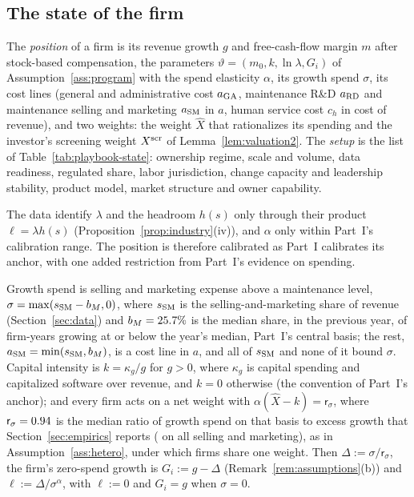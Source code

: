 \subsection{The state of the firm}\label{sec:playbook-state}

\begin{definition}[State]\label{def:playbook-state}
The \emph{position} of a firm is its revenue growth $g$ and free-cash-flow margin $m$ after stock-based compensation, the parameters $\vartheta=(m_0,k,\ln\lambda,G_i)$ of Assumption~\ref{ass:program} with the spend elasticity $\alpha$, its growth spend $\sigma$, its cost lines (general and administrative cost $a_{\rm GA}$, maintenance R\&D $a_{\rm RD}$ and maintenance selling and marketing $a_{\rm SM}$ in $a$, human service cost $c_h$ in cost of revenue), and two weights: the weight $\hat X$ that rationalizes its spending and the investor's screening weight $X^{\rm scr}$ of Lemma~\ref{lem:valuation2}. The \emph{setup} is the list of Table~\ref{tab:playbook-state}: ownership regime, scale and volume, data readiness, regulated share, labor jurisdiction, change capacity and leadership stability, product model, market structure and owner capability.
\end{definition}

The data identify $\lambda$ and the headroom $h(s)$ only through their product $\ell=\lambda h(s)$ (Proposition~\ref{prop:industry}(iv)), and $\alpha$ only within Part~I's calibration range. The position is therefore calibrated as Part~I calibrates its anchor, with one added restriction from Part~I's evidence on spending.

\begin{assumption}\label{ass:playbook-calib}
Growth spend is selling and marketing expense above a maintenance level, $\sigma=\max(s_{\rm SM}-b_M,0)$, where $s_{\rm SM}$ is the selling-and-marketing share of revenue (Section~\ref{sec:data}) and $b_M=25.7\%$ is the median share, in the previous year, of firm-years growing at or below the year's median, Part~I's central basis; the rest, $a_{\rm SM}=\min(s_{\rm SM},b_M)$, is a cost line in $a$, and all of $s_{\rm SM}$ and none of it bound $\sigma$. Capital intensity is $k=\kappa_g/g$ for $g>0$, where $\kappa_g$ is capital spending and capitalized software over revenue, and $k=0$ otherwise (the convention of Part~I's anchor); and every firm acts on a net weight with $\alpha(\hat X-k)=\mathsf r_\sigma$, where $\mathsf r_\sigma=0.94$ is the median ratio of growth spend on that basis to excess growth that Section~\ref{sec:empirics} reports (\SpendRatioPBAll{} on all selling and marketing), as in Assumption~\ref{ass:hetero}, under which firms share one weight. Then $\Delta:=\sigma/\mathsf r_\sigma$, the firm's zero-spend growth is $G_i:=g-\Delta$ (Remark~\ref{rem:assumptions}(b)) and $\ell:=\Delta/\sigma^{\alpha}$, with $\ell:=0$ and $G_i=g$ when $\sigma=0$.
\end{assumption}

